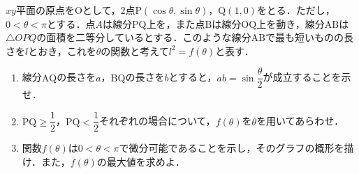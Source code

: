 \documentclass[../../main.tex]{subfiles}
\begin{document}
$xy$平面の原点を$\mathrm{O}$として，$2$点$\mathrm{P}(\cos\theta,\sin\theta)$，$\mathrm{Q}(1,0)$をとる．ただし，$0<\theta<\pi$とする．点$A$は線分$\mathrm{PQ}$上を，また点$\mathrm{B}$は線分$\mathrm{OQ}$上を動き，線分$\mathrm{AB}$は$\triangle OPQ$の面積を二等分しているとする．このような線分$\mathrm{AB}$で最も短いものの長さを$l$とおき，これを$\theta$の関数と考えて$l^2=f(\theta)$と表す．
\begin{enumerate}
  \item 線分$\mathrm{AQ}$の長さを$a$，$\mathrm{BQ}$の長さを$b$とすると，$ab=\sin\dfrac{\theta}{2}$が成立することを示せ．
  \item $\mathrm{PQ}\ge \dfrac{1}{2}$，$\mathrm{PQ}<\dfrac{1}{2}$それぞれの場合について，$f(\theta)$を$\theta$を用いてあらわせ．
  \item 関数$f(\theta)$は$0<\theta<\pi$で微分可能であることを示し，そのグラフの概形を描け．また，$f(\theta)$の最大値を求めよ．
\end{enumerate}
\end{document}
